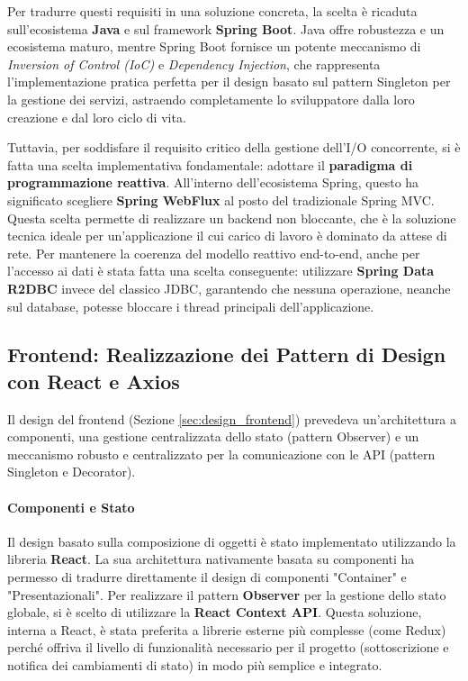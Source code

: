 \documentclass[12pt,a4paper,openright,twoside]{book}
\begin{document}
Per tradurre questi requisiti in una soluzione concreta, la scelta è ricaduta sull'ecosistema \textbf{Java} e sul framework \textbf{Spring Boot}. Java offre robustezza e un ecosistema maturo, mentre Spring Boot fornisce un potente meccanismo di \textit{Inversion of Control (IoC)} e \textit{Dependency Injection}, che rappresenta l'implementazione pratica perfetta per il design basato sul pattern Singleton per la gestione dei servizi, astraendo completamente lo sviluppatore dalla loro creazione e dal loro ciclo di vita.

Tuttavia, per soddisfare il requisito critico della gestione dell'I/O concorrente, si è fatta una scelta implementativa fondamentale: adottare il \textbf{paradigma di programmazione reattiva}. All'interno dell'ecosistema Spring, questo ha significato scegliere \textbf{Spring WebFlux} al posto del tradizionale Spring MVC. Questa scelta permette di realizzare un backend non bloccante, che è la soluzione tecnica ideale per un'applicazione il cui carico di lavoro è dominato da attese di rete. Per mantenere la coerenza del modello reattivo end-to-end, anche per l'accesso ai dati è stata fatta una scelta conseguente: utilizzare \textbf{Spring Data R2DBC} invece del classico JDBC, garantendo che nessuna operazione, neanche sul database, potesse bloccare i thread principali dell'applicazione.

\subsection{Frontend: Realizzazione dei Pattern di Design con React e Axios}
Il design del frontend (Sezione \ref{sec:design_frontend}) prevedeva un'architettura a componenti, una gestione centralizzata dello stato (pattern Observer) e un meccanismo robusto e centralizzato per la comunicazione con le API (pattern Singleton e Decorator).

\paragraph{Componenti e Stato}
Il design basato sulla composizione di oggetti è stato implementato utilizzando la libreria \textbf{React}. La sua architettura nativamente basata su componenti ha permesso di tradurre direttamente il design di componenti "Container" e "Presentazionali". Per realizzare il pattern \textbf{Observer} per la gestione dello stato globale, si è scelto di utilizzare la \textbf{React Context API}. Questa soluzione, interna a React, è stata preferita a librerie esterne più complesse (come Redux) perché offriva il livello di funzionalità necessario per il progetto (sottoscrizione e notifica dei cambiamenti di stato) in modo più semplice e integrato.
\end{document}
